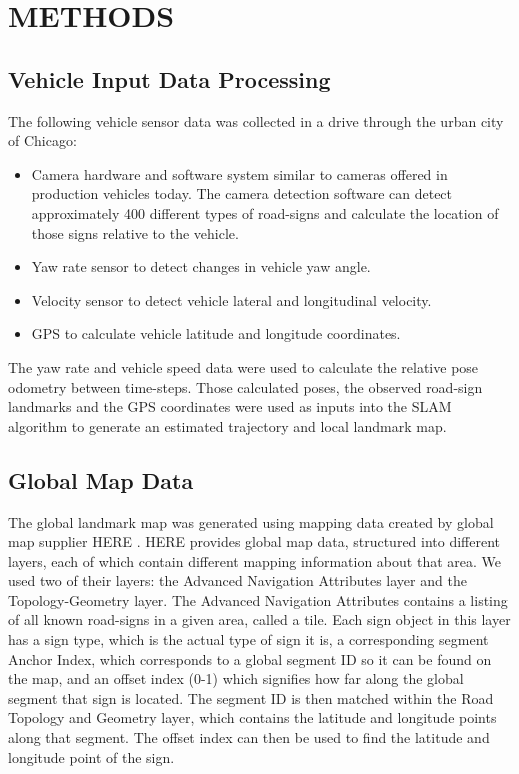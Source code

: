 \documentclass[letterpaper, 10 pt, conference]{ieeeconf}  %
\begin{document}
\section{METHODS}

\subsection{Vehicle Input Data Processing}

The following vehicle sensor data was collected in a drive through the urban city of Chicago:
\begin{itemize}
\item Camera hardware and software system similar to cameras offered in production vehicles today. The camera detection software can detect approximately 400 different types of road-signs and calculate the location of those signs relative to the vehicle. 
\item Yaw rate sensor to detect changes in vehicle yaw angle.
\item Velocity sensor to detect vehicle lateral and longitudinal velocity.
\item GPS to calculate vehicle latitude and longitude coordinates.
\end{itemize}

The yaw rate and vehicle speed data were used to calculate the relative pose odometry between time-steps. Those calculated poses, the observed road-sign landmarks and the GPS coordinates were used as inputs into the SLAM algorithm to generate an estimated trajectory and local landmark map. 

\subsection{Global Map Data}

The global landmark map was generated using mapping data created by global map supplier HERE \cite{cHERE}. HERE provides global map data, structured into different layers, each of which contain different mapping information about that area. We used two of their layers: the Advanced Navigation Attributes layer and the Topology-Geometry layer. The Advanced Navigation Attributes contains a listing of all known road-signs in a given area, called a tile. Each sign object in this layer has a sign type, which is the actual type of sign it is, a corresponding segment Anchor Index, which corresponds to a global segment ID so it can be found on the map, and an offset index (0-1) which signifies how far along the global segment that sign is located. The segment ID is then matched within the Road Topology and Geometry layer, which contains the latitude and longitude points along that segment. The offset index can then be used to find the latitude and longitude point of the sign.
\end{document}
